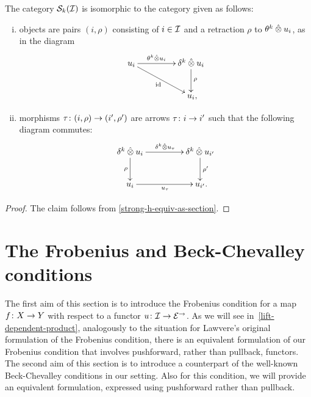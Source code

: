 \documentclass[reqno,10pt,a4paper,oneside,draft]{amsart}
\begin{document}
\begin{lemma} \label{strong-h-equiv-as-section-algebraic}
The category $\cal{S}_k(\cal{I})$ is isomorphic to the category given as follows:
\begin{enumerate}[(i)]
\item objects are pairs $(i, \rho)$ consisting of $i \in \cal{I}$ and a retraction $\rho$ to $\thetak \hatotimes u_i$, as in the diagram
\[
\xymatrix@C+2em{
  u_i
  \ar[r]^-{\thetak \hatotimes u_i }
  \ar[dr]_{\id}
&
  \kcyl \hatotimes u_i \ar[d]^{\rho}
\\&
  u_i \rlap{,}
}
\]
\item morphisms $\tau \co (i, \rho) \to (i', \rho')$ are arrows $\tau \co i \to i'$ such that the following diagram commutes:
\[
\xymatrix@C+2em{
  \kcyl \hatotimes u_i
  \ar[d]_-{\rho}
  \ar[r]^{\kcyl \hatotimes u_\tau }
&
 \kcyl \hatotimes u_{i'}
  \ar[d]^-{\rho'}
\\
  u_i
  \ar[r]_{u_\tau}
&
  u_{i'} \rlap{.}
}
\]
\end{enumerate}
\end{lemma}

\begin{proof}
The claim follows from \cref{strong-h-equiv-as-section}.
\end{proof}






\section{The Frobenius and Beck-Chevalley conditions}
\label{sec:frobc}

The first aim of this section is to introduce the Frobenius condition for a map $f \co X \to Y$ with respect to a functor $u \co \cal{I}
\to \cal{E}^\to$.
As we will see in~\cref{lift-dependent-product}, analogously to the situation for Lawvere's original formulation of the Frobenius condition, there is an equivalent formulation of our Frobenius condition that involves pushforward, rather than pullback, functors.
The second aim of this section is to introduce a counterpart of the well-known Beck-Chevalley conditions in our setting.
Also for this condition, we will provide an equivalent formulation, expressed using pushforward rather than pullback.
\end{document}
